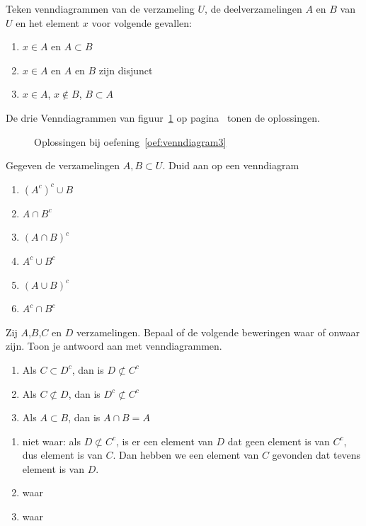\begin{oef}
\label{oef:venndiagram3}
Teken venndiagrammen van de verzameling $U$, de deelverzamelingen $A$ en $B$ van $U$ en het element $x$ voor volgende gevallen:
\begin{enumerate}
\item $x\in A$ en $A\subset B$
\item $x\in A$ en $A$ en $B$ zijn disjunct
\item $x\in A$, $x\not \in B$, $B\subset A$
\end{enumerate}
\begin{opl}
De drie Venndiagrammen van figuur~\ref{fig:Venn3} op pagina~\pageref{fig:Venn3} tonen de oplossingen.
\begin{figure}[h!tbp]
\centering
\subfloat[oef a]{}\qquad
\subfloat[oef b]{}\qquad
\subfloat[oef c]{}
\caption{Oplossingen bij oefening~\ref{oef:venndiagram3} }
\label{fig:Venn3}
\end{figure}
\end{opl}
\end{oef}



\begin{oef}
Gegeven de verzamelingen $A,B\subset U$. Duid aan op een venndiagram
\begin{enumerate}
\item $  (A^c)^c \cup B$
\item $A\cap  B^c$
\item $(A\cap B)^c$
\item $ A^c \cup  B^c$
\item $ (A\cup B)^c$
\item $ A^c \cap  B^c$
\end{enumerate}
\end{oef}



\begin{oef}
Zij $A$,$B$,$C$ en $D$ verzamelingen. Bepaal of de volgende beweringen waar of onwaar zijn. Toon je antwoord aan met venndiagrammen.
\begin{enumerate}
\item Als $C\subset D^c$, dan is $D \not \subset C^c$
\item Als $C\not \subset D$, dan is $D^c \not \subset C^c$
\item Als $A\subset B$, dan is $A\cap B =A$
\end{enumerate}
\begin{opl}
\begin{enumerate}
\item niet waar: als $D \not \subset C^c$, is er  een element van $D$ dat geen element is van $C^c$, dus element is van $C$. Dan hebben we een element van $C$ gevonden dat tevens element is van $D$.
\item waar
\item waar
\end{enumerate}
\end{opl}
\end{oef}


